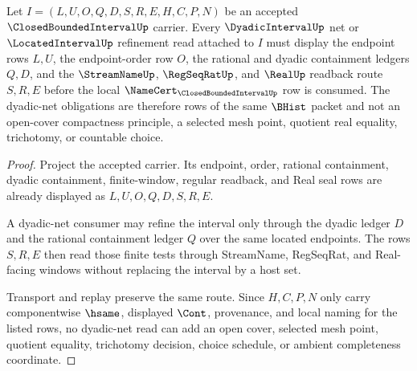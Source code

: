\begin{theorem}
\label{thm:closed-bounded-interval-dyadic-net-obligations}
Let $I=(L,U,O,Q,D,S,R,E,H,C,P,N)$ be an accepted $\ClosedBoundedIntervalUp$ carrier. Every $\DyadicIntervalUp$ net or $\LocatedIntervalUp$ refinement read attached to $I$ must display the endpoint rows $L,U$, the endpoint-order row $O$, the rational and dyadic containment ledgers $Q,D$, and the $\StreamNameUp$, $\RegSeqRatUp$, and $\RealUp$ readback route $S,R,E$ before the local $\NameCert_{\ClosedBoundedIntervalUp}$ row is consumed. The dyadic-net obligations are therefore rows of the same $\BHist$ packet and not an open-cover compactness principle, a selected mesh point, quotient real equality, trichotomy, or countable choice.
\end{theorem}
\begin{proof}
Project the accepted carrier. Its endpoint, order, rational containment, dyadic containment, finite-window, regular readback, and Real seal rows are already displayed as $L,U,O,Q,D,S,R,E$.

A dyadic-net consumer may refine the interval only through the dyadic ledger $D$ and the rational containment ledger $Q$ over the same located endpoints. The rows $S,R,E$ then read those finite tests through StreamName, RegSeqRat, and Real-facing windows without replacing the interval by a host set.

Transport and replay preserve the same route. Since $H,C,P,N$ only carry componentwise $\hsame$, displayed $\Cont$, provenance, and local naming for the listed rows, no dyadic-net read can add an open cover, selected mesh point, quotient equality, trichotomy decision, choice schedule, or ambient completeness coordinate.
\end{proof}

